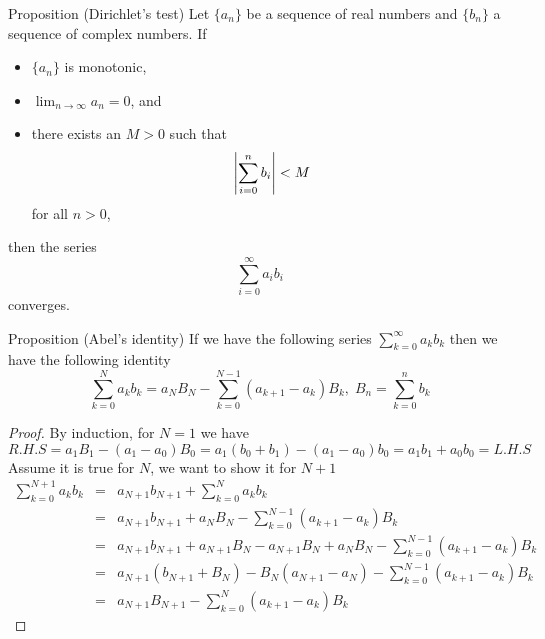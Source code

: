 \begin{thmbox}{Proposition (Dirichlet's test)}
Let $\{a_n\}$ be a sequence of real numbers and $\{b_n\}$ a sequence of complex numbers. If
\begin{itemize}
    \item $\{a_n\}$ is monotonic,
    \item $\lim_{n \to \infty} a_n = 0$, and
    \item there exists an $M > 0$ such that
    $$ \left\lvert \sum_{i=0}^n b_i\right\rvert < M $$
    for all $n > 0$,
\end{itemize}
then the series
$$ \sum_{i=0}^\infty a_i b_i $$
converges.
\end{thmbox}

\begin{thmbox}{Proposition (Abel's identity)} If we have the following series $\displaystyle \sum_{k=0}^\infty a_kb_k$ then
we have the following identity
\[\sum_{k=0}^N a_k b_k = a_NB_N - \sum_{k=0}^{N-1} (a_{k+1}-a_k)B_k,\; B_n =\sum_{k=0}^n b_k\]
\end{thmbox}
\begin{proof}
By induction, for $N=1$ we have
\[R.H.S= a_1B_1 - (a_1-a_0)B_0= a_1(b_0+b_1)-(a_1-a_0)b_0=a_1b_1+a_0b_0 = L.H.S\]
Assume it is true for $N$, we want to show it for $N+1$
\[\begin{array}{ccl}
\displaystyle \sum_{k=0}^{N+1} a_kb_k &=&\displaystyle a_{N+1}b_{N+1} +  \sum_{k=0}^N a_k b_k \\
&=& \displaystyle a_{N+1}b_{N+1} + a_N B_N - \sum_{k=0}^{N-1} (a_{k+1}-a_k)B_k \\
&=&\displaystyle a_{N+1}b_{N+1} + a_{N+1}B_{N}-a_{N+1}B_{N} + a_N B_N - \sum_{k=0}^{N-1} (a_{k+1}-a_k)B_k\\
&=&\displaystyle a_{N+1}(b_{N+1} + B_{N})-B_{N}(a_{N+1} - a_N ) - \sum_{k=0}^{N-1} (a_{k+1}-a_k)B_k \\
&=& \displaystyle a_{N+1}B_{N+1} - \sum_{k=0}^{N} (a_{k+1}-a_k)B_k
\end{array}\]
\end{proof}

